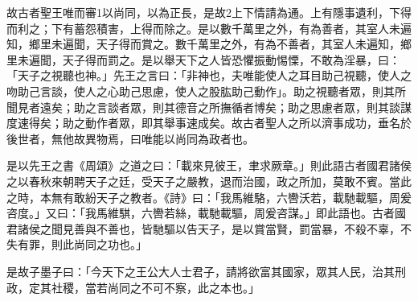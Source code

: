 \begin{pinyinscope}
故古者聖王唯而審1以尚同，以為正長，是故2上下情請為通。上有隱事遺利，下得而利之；下有蓄怨積害，上得而除之。是以數千萬里之外，有為善者，其室人未遍知，鄉里未遍聞，天子得而賞之。數千萬里之外，有為不善者，其室人未遍知，鄉里未遍聞，天子得而罰之。是以舉天下之人皆恐懼振動惕慄，不敢為淫暴，曰：「天子之視聽也神。」先王之言曰：「非神也，夫唯能使人之耳目助己視聽，使人之吻助己言談，使人之心助己思慮，使人之股肱助己動作」。助之視聽者眾，則其所聞見者遠矣；助之言談者眾，則其德音之所撫循者博矣；助之思慮者眾，則其談謀度速得矣；助之動作者眾，即其舉事速成矣。故古者聖人之所以濟事成功，垂名於後世者，無他故異物焉，曰唯能以尚同為政者也。

是以先王之書《周頌》之道之曰：「載來見彼王，聿求厥章。」則此語古者國君諸侯之以春秋來朝聘天子之廷，受天子之嚴教，退而治國，政之所加，莫敢不賓。當此之時，本無有敢紛天子之教者。《詩》曰：「我馬維駱，六轡沃若，載馳載驅，周爰咨度。」又曰：「我馬維騏，六轡若絲，載馳載驅，周爰咨謀。」即此語也。古者國君諸侯之聞見善與不善也，皆馳驅以告天子，是以賞當賢，罰當暴，不殺不辜，不失有罪，則此尚同之功也。」

是故子墨子曰：「今天下之王公大人士君子，請將欲富其國家，眾其人民，治其刑政，定其社稷，當若尚同之不可不察，此之本也。」


\end{pinyinscope}